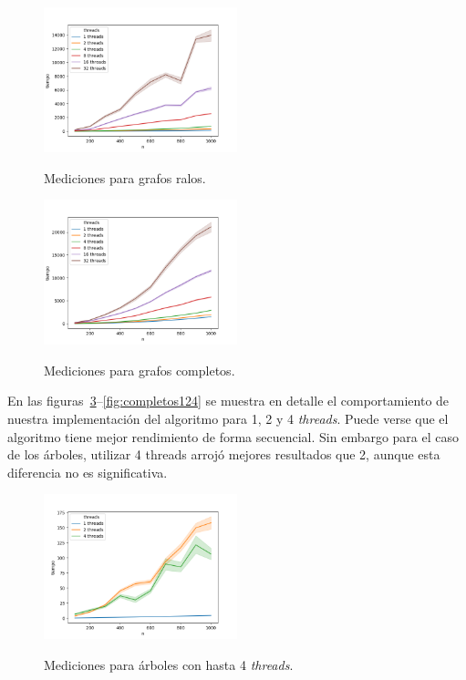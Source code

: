 \begin{figure}[h]
\caption{Mediciones para grafos ralos.}
\centering
\includegraphics[width=0.5\textwidth]{imagenes/ralo.png} \\%
\label{fig:ralos}
\end{figure}

\begin{figure}[h]
\caption{Mediciones para grafos completos.}
\centering
\includegraphics[width=0.5\textwidth]{imagenes/completo.png} \\%
\label{fig:completos}
\end{figure}


En las figuras~\ref{fig:arboles124}--\ref{fig:completos124} se muestra en
detalle el comportamiento de nuestra implementación del algoritmo para 1, 2 y 4
\textit{threads}. Puede verse que el algoritmo tiene mejor rendimiento de forma
secuencial. Sin embargo para el caso de los árboles, utilizar 4 threads arrojó
mejores resultados que 2, aunque esta diferencia no es significativa.

\begin{figure}[h]
\caption{Mediciones para árboles con hasta 4 \textit{threads}.}
\centering
\includegraphics[width=0.5\textwidth]{imagenes/arbol-124.png} \\%
\label{fig:arboles124}
\end{figure}

